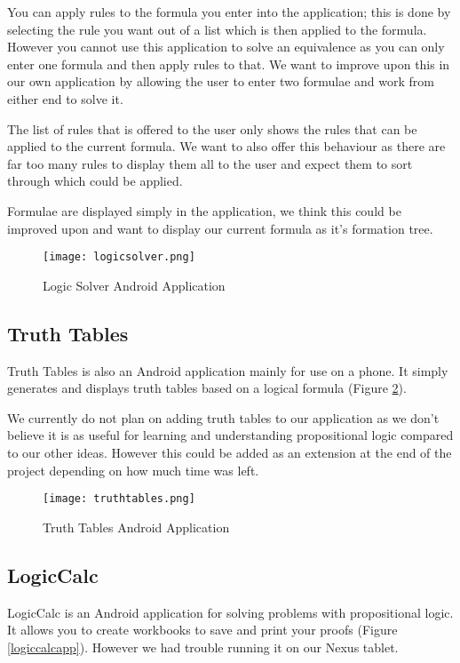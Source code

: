 \documentclass{report}
\begin{document}
You can apply rules to the formula you enter into the application; this is done by selecting the rule you want out of a list which is then applied to the formula. However you cannot use this application to solve an equivalence as you can only enter one formula and then apply rules to that. We want to improve upon this in our own application by allowing the user to enter two formulae and work from either end to solve it.

The list of rules that is offered to the user only shows the rules that can be applied to the current formula. We want to also offer this behaviour as there are far too many rules to display them all to the user and expect them to sort through which could be applied.

Formulae are displayed simply in the application, we think this could be improved upon and want to display our current formula as it's formation tree.

\begin{figure}[ht]
    \centering
    \texttt{[image: logicsolver.png]}
    \caption{Logic Solver Android Application}
    \label{logicsolver}
\end{figure}

\subsection{Truth Tables}

Truth Tables is also an Android application mainly for use on a phone. It simply generates and displays truth tables based on a logical formula (Figure \ref{truthtables}).

We currently do not plan on adding truth tables to our application as we don't believe it is as useful for learning and understanding propositional logic compared to our other ideas. However this could be added as an extension at the end of the project depending on how much time was left.

\begin{figure}[ht]
    \centering
    \texttt{[image: truthtables.png]}
    \caption{Truth Tables Android Application}
    \label{truthtables}
\end{figure}

\subsection{LogicCalc}

LogicCalc is an Android application for solving problems with propositional logic. It allows you to create workbooks to save and print your proofs (Figure \ref{logiccalcapp}). However we had trouble running it on our Nexus tablet.
\end{document}
